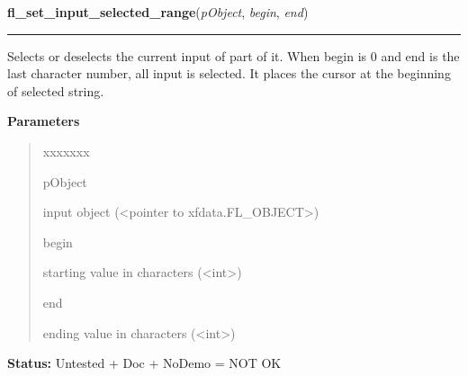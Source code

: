 \hspace{.8\funcindent}\begin{boxedminipage}{\funcwidth}

    \raggedright \textbf{fl\_set\_input\_selected\_range}(\textit{pObject}, \textit{begin}, \textit{end})

    \vspace{-1.5ex}

    \rule{\textwidth}{0.5\fboxrule}
\setlength{\parskip}{2ex}
    Selects or deselects the current input of part of it. When begin is 0 
    and end is the last character number, all input is selected. It places 
    the cursor at the beginning of selected string.

\setlength{\parskip}{1ex}
      \textbf{Parameters}
      \vspace{-1ex}

      \begin{quote}
        \begin{Ventry}{xxxxxxx}

          \item[pObject]

          input object ({\textless}pointer to 
          xfdata.FL\_OBJECT{\textgreater})

          \item[begin]

          starting value in characters ({\textless}int{\textgreater})

          \item[end]

          ending value in characters ({\textless}int{\textgreater})

        \end{Ventry}

      \end{quote}

\textbf{Status:} Untested + Doc + NoDemo = NOT OK



    \end{boxedminipage}

    \label{xformslib:library:fl_get_input_selected_range}

    \vspace{0.5ex}

